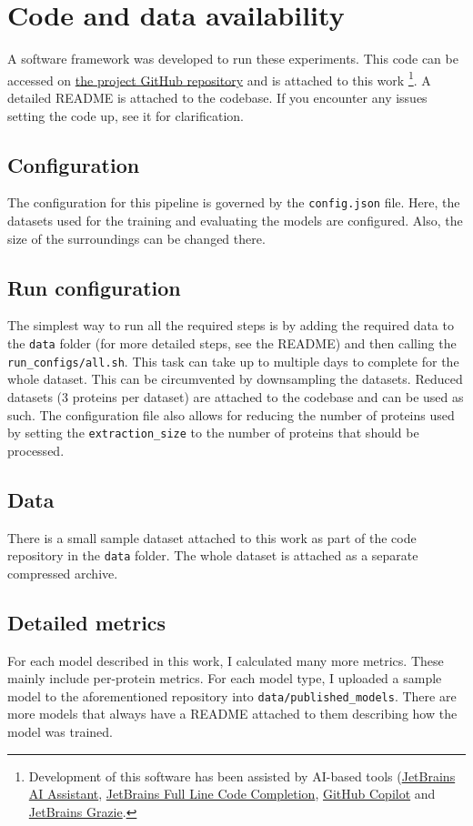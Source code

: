 \chapter{Code and data availability}

A software framework was developed to run these experiments. This code can be accessed on \href{https://github.com/eleniel-mocna/Refined}{the project GitHub repository} and is attached to this work \footnote{Development of this software has been assisted by AI-based tools (\href{https://www.jetbrains.com/ai/}{JetBrains AI Assistant}, \href{https://blog.jetbrains.com/blog/2024/04/04/full-line-code-completion-in-jetbrains-ides-all-you-need-to-know/}{JetBrains Full Line Code Completion}, \href{https://github.com/features/copilot}{GitHub Copilot} and \href{https://lp.jetbrains.com/grazie-for-software-teams/}{JetBrains Grazie}.}. A detailed README is attached to the codebase. If you encounter any issues setting the code up, see it for clarification.

\section{Configuration}

The configuration for this pipeline is governed by the \texttt{config.json} file. Here, the datasets used for the training and evaluating the models are configured. Also, the size of the surroundings can be changed there.

\section{Run configuration}
The simplest way to run all the required steps is by adding the required data to the \texttt{data} folder (for more detailed steps, see the README) and then calling the \texttt{run\_configs/all.sh}. This task can take up to multiple days to complete for the whole dataset. This can be circumvented by downsampling the datasets. Reduced datasets (3 proteins per dataset) are attached to the codebase and can be used as such. The configuration file also allows for reducing the number of proteins used by setting the \texttt{extraction\_size} to the number of proteins that should be processed.

\section{Data}

There is a small sample dataset attached to this work as part of the code repository in the \texttt{data} folder. The whole dataset is attached as a separate compressed archive.

\section{Detailed metrics}
\label{metrics_availability}

For each model described in this work, I calculated many more metrics. These mainly include per-protein metrics. For each model type, I uploaded a sample model to the aforementioned repository into \texttt{data/published\_models}. There are more models that always have a README attached to them describing how the model was trained.
